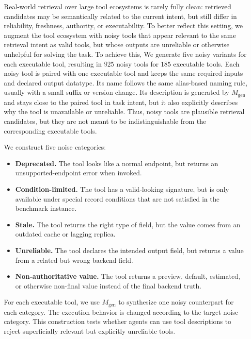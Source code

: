 Real-world retrieval over large tool ecosystems is rarely fully clean: retrieved candidates may be semantically related to the current intent, but still differ in reliability, freshness, authority, or executability.
To better reflect this setting, we augment the tool ecosystem with noisy tools that appear relevant to the same retrieval intent as valid tools, but whose outputs are unreliable or otherwise unhelpful for solving the task.
To achieve this, We generate five noisy variants for each executable tool, resulting in $925$ noisy tools for $185$ executable tools.
Each noisy tool is paired with one executable tool and keeps the same required inputs and declared output datatype.
Its name follows the same alias-based naming rule, usually with a small suffix or version change.
Its description is generated by $M_{\mathrm{gen}}$ and stays close to the paired tool in task intent, but it also explicitly describes why the tool is unavailable or unreliable.
Thus, noisy tools are plausible retrieval candidates, but they are not meant to be indistinguishable from the corresponding executable tools.

We construct five noise categories:
\begin{itemize}
\item \textbf{Deprecated.} The tool looks like a normal endpoint, but returns an unsupported-endpoint error when invoked.
\item \textbf{Condition-limited.} The tool has a valid-looking signature, but is only available under special record conditions that are not satisfied in the benchmark instance.
\item \textbf{Stale.} The tool returns the right type of field, but the value comes from an outdated cache or lagging replica.
\item \textbf{Unreliable.} The tool declares the intended output field, but returns a value from a related but wrong backend field.
\item \textbf{Non-authoritative value.} The tool returns a preview, default, estimated, or otherwise non-final value instead of the final backend truth.
\end{itemize}

For each executable tool, we use $M_{\mathrm{gen}}$ to synthesize one noisy counterpart for each category.
The execution behavior is changed according to the target noise category.
This construction tests whether agents can use tool descriptions to reject superficially relevant but explicitly unreliable tools.

